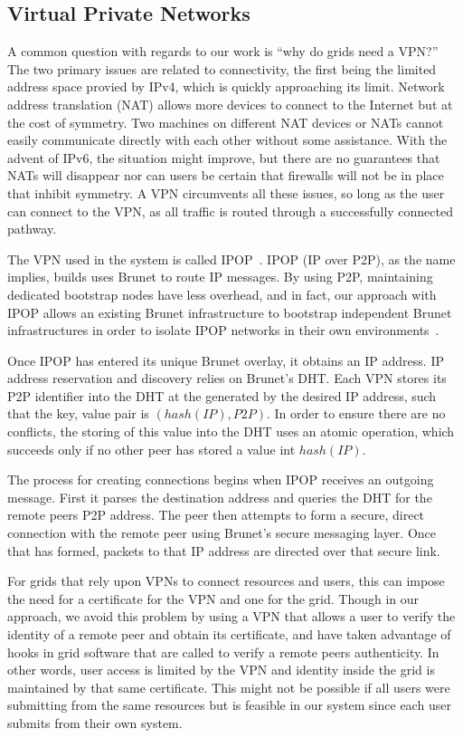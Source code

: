\documentclass[conference]{IEEEtran}
\begin{document}
\subsection{Virtual Private Networks}

A common question with regards to our work is ``why do grids need a VPN?'' The
two primary issues are related to connectivity, the first being the limited
address space provied by IPv4, which is quickly approaching its limit.  Network
address translation (NAT) allows more devices to connect to the Internet but at
the cost of symmetry.  Two machines on different NAT devices or NATs cannot
easily communicate directly with each other without some assistance.  With the
advent of IPv6, the situation might improve, but there are no guarantees that
NATs will disappear nor can users be certain that firewalls will not be in
place that inhibit symmetry.  A VPN circumvents all these issues, so long as
the user can connect to the VPN, as all traffic is routed through a
successfully connected pathway.

The VPN used in the system is called IPOP~\cite{groupvpn, ipop}.  IPOP (IP over
P2P), as the name implies, builds uses Brunet to route IP messages.  By using
P2P, maintaining dedicated bootstrap nodes have less overhead, and in fact, our
approach with IPOP allows an existing Brunet infrastructure to bootstrap
independent Brunet infrastructures in order to isolate IPOP networks in their
own environments~\cite{virtual_private_overlays}.

Once IPOP has entered its unique Brunet overlay, it obtains an IP address.  IP
address reservation and discovery relies on Brunet's DHT.  Each VPN stores its
P2P identifier into the DHT at the generated by the desired IP address, such
that the key, value pair is $(hash(IP), P2P)$.  In order to ensure there are no
conflicts, the storing of this value into the DHT uses an atomic operation,
which succeeds only if no other peer has stored a value int $hash(IP)$.

The process for creating connections begins when IPOP receives an outgoing
message.  First it parses the destination address and queries the DHT for the
remote peers P2P address.  The peer then attempts to form a secure, direct
connection with the remote peer using Brunet's secure messaging layer.  Once
that has formed, packets to that IP address are directed over that secure link.

For grids that rely upon VPNs to connect resources and users, this can impose
the need for a certificate for the VPN and one for the grid.  Though in our
approach, we avoid this problem by using a VPN that allows a user to verify the
identity of a remote peer and obtain its certificate, and have taken advantage
of hooks in grid software that are called to verify a remote peers
authenticity.  In other words, user access is limited by the VPN and identity
inside the grid is maintained by that same certificate.  This might not be
possible if all users were submitting from the same resources but is feasible
in our system since each user submits from their own system.
\end{document}
